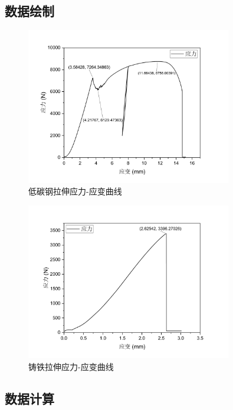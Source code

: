 \documentclass[a4paper,utf8]{article}
\begin{document}
\subsection{数据绘制}
\begin{figure}[!ht]
    \caption{低碳钢拉伸应力-应变曲线}
    \includegraphics[width=0.8\textwidth]{steelPull.pdf}
\end{figure}\newpage
\begin{figure}[!ht]
    \caption{铸铁拉伸应力-应变曲线}
    \includegraphics[width=0.8\textwidth]{ironPull.pdf}
\end{figure}
\subsection{数据计算}
\end{document}
